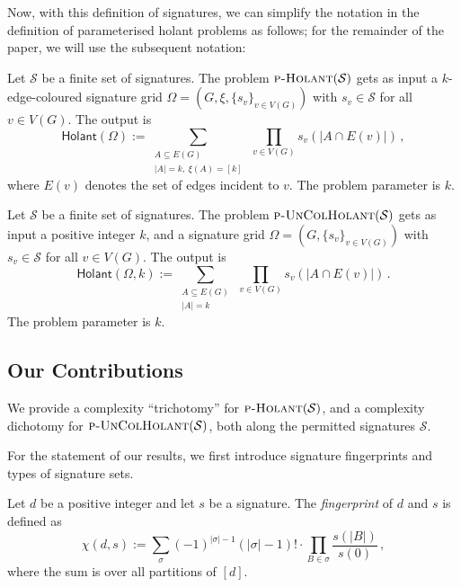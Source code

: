 \documentclass[authorcolumns,numberwithinsect]{no-lipics-v2022}
\newcommand{\holantprob}{\text{\sc{p-Holant}}}
\newcommand{\holant}{\mathsf{Holant}}
\begin{document}
Now, with this definition of signatures, we can simplify the notation in the definition of parameterised holant problems as follows; for the remainder of the paper, we will use the subsequent notation:

\begin{definition}\label{def:intro_param_holant}
    Let $\mathcal{S}$ be a finite set of signatures. The problem $\holantprob(\mathcal{S})$ gets as input a
    $k$-edge-coloured signature grid $\Omega=(G,\xi,\{s_v\}_{v\in V(G)})$ with $s_v\in \mathcal{S}$ for all $v\in V(G)$. The output is
    \[ \holant(\Omega):= \sum_{\substack{A \subseteq E(G)\\|A|=k,~\xi(A)=[k]}}~\prod_{v\in V(G)} s_v(|A \cap E(v)|)\,, \]
    where $E(v)$ denotes the set of edges incident to $v$. The problem parameter is $k$.
\end{definition}
\begin{definition}\label{def:intro_param_uncol_holant}
    Let $\mathcal{S}$ be a finite set of signatures. The problem $\text{\sc{p-UnColHolant}}(\mathcal{S})$ gets as input a positive integer $k$, and a signature grid $\Omega=(G,\{s_v\}_{v\in V(G)})$ with $s_v\in \mathcal{S}$ for all $v\in V(G)$. The output is
    \[ \holant(\Omega,k):= \sum_{\substack{A \subseteq E(G)\\|A|=k}}~\prod_{v\in V(G)} s_v(|A \cap E(v)|)\,. \]
    The problem parameter is $k$.
\end{definition}

\subsection{Our Contributions}
We provide a complexity ``trichotomy'' for $\holantprob(\mathcal{S})$, and a complexity dichotomy for $\text{\sc{p-UnColHolant}}(\mathcal{S})$, both along the permitted signatures $\mathcal{S}$. 

For the statement of our results, we first introduce signature fingerprints and types of signature sets.

\begin{definition}\label{def:fingerprint_intro}
Let $d$ be a positive integer and let $s$ be a signature. The \emph{fingerprint} of $d$ and $s$ is defined as
    \[\chi(d,s) := \sum_{\sigma} (-1)^{|\sigma|-1} (|\sigma|-1)! \cdot \prod_{B \in \sigma} \frac{s(|B|)}{s(0)} \,,\]
    where the sum is over all partitions of $[d]$.
\end{definition}
\end{document}
